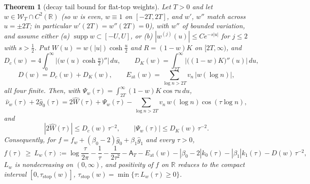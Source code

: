 \documentclass[11pt]{amsart}
\newtheorem{theorem}{Theorem}[section]
\theoremstyle{definition}
\theoremstyle{remark}
\newcommand{\R}{\mathbb R}
\newcommand{\supp}{\operatorname{supp}}
\newcommand{\gh}[1]{\widehat g_{#1}}
\newcommand{\nuh}{\widehat\nu}
\newcommand{\Wcl}{\mathcal W_T}
\newcommand{\Aconst}{\mathsf A_T}
\begin{document}
\begin{theorem}[decay tail bound for flat-top weights]\label{thm:Dtail}
Let $T>0$ and let $w\in\Wcl\cap C^2(\R)$ (so $w$ is even, $w\equiv1$ on $[-2T,2T]$, and $w'$, $w''$
match across $u=\pm2T$; in particular $w'(2T)=w''(2T)=0$), with $w''$ of bounded variation, and
assume either \emph{(a)} $\supp w\subset[-U,U]$, or \emph{(b)} $|w^{(j)}(u)|\le Ce^{-s|u|}$ for
$j\le2$ with $s>\frac12$. Put $W(u)=w(|u|)\cosh\frac u2$ and $R=(1-w)K$ on $[2T,\infty)$, and
\[
D_c(w)=4\int_0^\infty\Big|\big(w(u)\cosh\tfrac u2\big)''\Big|\,du,\qquad
D_K(w)=\int_{2T}^\infty\big|\big((1-w)K\big)''(u)\big|\,du,
\]
\[
D(w)=D_c(w)+D_K(w),\qquad E_{\mathrm{at}}(w)=\sum_{\log n>2T}v_n\,|w(\log n)| ,
\]
all four finite. Then, with $\Psi_w(\tau)=\int_{2T}^\infty(1-w)K\cos\tau u\,du$,
\begin{equation}\label{eq:Dsplit}
\nuh_w(\tau)+2\gh0(\tau)=2\widehat W(\tau)+\Psi_w(\tau)-\sum_{\log n>2T}v_n\,w(\log n)\cos(\tau\log n),
\end{equation}
and
\[
|2\widehat W(\tau)|\le D_c(w)\,\tau^{-2},\qquad |\Psi_w(\tau)|\le D_K(w)\,\tau^{-2}.
\]
Consequently, for $f=f_w+(\beta_0-2)\gh0+\beta_1\gh1$ and every $\tau>0$,
\[
f(\tau)\ \ge\ L_w(\tau):=\log\frac\tau{2\pi}-\frac1\tau-\frac1{2\tau^2}-\Aconst-E_{\mathrm{at}}(w)
-|\beta_0-2|k_0(\tau)-|\beta_1|k_1(\tau)-D(w)\,\tau^{-2},
\]
$L_w$ is nondecreasing on $(0,\infty)$, and positivity of $f$ on $\R$ reduces to the compact
interval $[0,\tau_{\mathrm{stop}}(w)]$, $\tau_{\mathrm{stop}}(w)=\min\{\tau:L_w(\tau)\ge0\}$.
\end{theorem}
\end{document}
